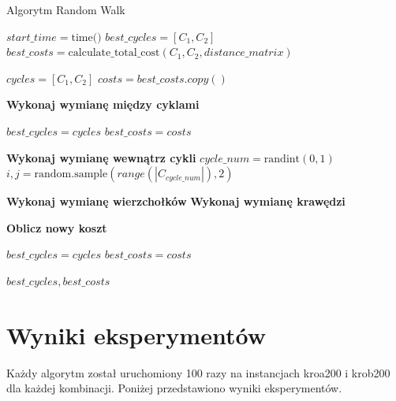 \documentclass[12pt,a4paper]{article}
\begin{document}
\begin{algorithm}[H]
\caption{Algorytm Random Walk}
\label{alg:random_walk}
\begin{algorithmic}[1]

\State $start\_time = \text{time()}$
\State $best\_cycles = [C_1, C_2]$
\State $best\_costs = \text{calculate\_total\_cost}(C_1, C_2, distance\_matrix)$

\State $cycles = [C_1, C_2]$
\State $costs = best\_costs.copy()$

        \State \textbf{Wykonaj wymianę między cyklami}


            \State $best\_cycles = cycles$
            \State $best\_costs = costs$
        \EndIf

    \Else
        \State \textbf{Wykonaj wymianę wewnątrz cykli}
        \State $cycle\_num = \text{randint}(0, 1)$
        \State $i, j = \text{random.sample}(range(|C_{cycle\_num}|), 2)$
        
            \State \textbf{Wykonaj wymianę wierzchołków}
        \Else
            \State \textbf{Wykonaj wymianę krawędzi}
        \EndIf
        
        \State \textbf{Oblicz nowy koszt}

            \State $best\_cycles = cycles$
            \State $best\_costs = costs$
        \EndIf
    \EndIf
\EndWhile

\State \Return $best\_cycles, best\_costs$
\end{algorithmic}
\end{algorithm}

\newpage
\section{Wyniki eksperymentów}
Każdy algorytm został uruchomiony 100 razy na instancjach kroa200 i krob200 dla każdej kombinacji. Poniżej przedstawiono wyniki eksperymentów.
\end{document}
